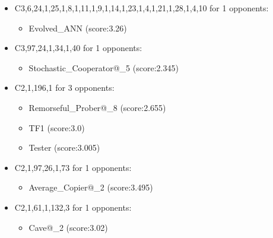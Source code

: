 \begin{appendices}
\begin{itemize}
        \item C3,6,24,1,25,1,8,1,11,1,9,1,14,1,23,1,4,1,21,1,28,1,4,10 for 1 opponents:
        \begin{multicols}{3}
            \begin{itemize}
                \item Evolved\_ANN (score:3.26)
            \end{itemize}
        \end{multicols}

        \item C3,97,24,1,34,1,40 for 1 opponents:
        \begin{multicols}{3}
            \begin{itemize}
                \item Stochastic\_Cooperator@\_5 (score:2.345)
            \end{itemize}
        \end{multicols}

        \item C2,1,196,1 for 3 opponents:
        \begin{multicols}{3}
            \begin{itemize}
                \item Remorseful\_Prober@\_8 (score:2.655)
                \item TF1 (score:3.0)
                \item Tester (score:3.005)
            \end{itemize}
        \end{multicols}

        \item C2,1,97,26,1,73 for 1 opponents:
        \begin{multicols}{3}
            \begin{itemize}
                \item Average\_Copier@\_2 (score:3.495)
            \end{itemize}
        \end{multicols}

        \item C2,1,61,1,132,3 for 1 opponents:
        \begin{multicols}{3}
            \begin{itemize}
                \item Cave@\_2 (score:3.02)
            \end{itemize}
        \end{multicols}


\end{itemize}
\end{appendices}
